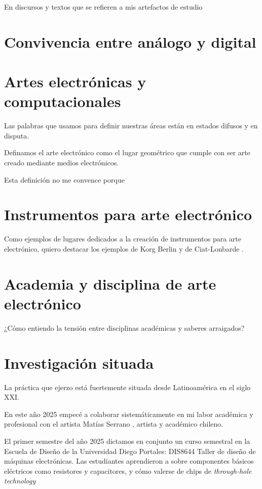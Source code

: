 \documentclass{article}
\begin{document}
En discursos y textos que se refieren a mis artefactos de estudio

\section{Convivencia entre análogo y digital}

\section{Artes electrónicas y computacionales}

Las palabras que usamos para definir nuestras áreas están en estados difusos y en disputa.

Definamos el arte electrónico como el lugar geométrico que cumple con ser arte creado mediante medios electrónicos.

Esta definición no me convence porque 


\section{Instrumentos para arte electrónico}

Como ejemplos de lugares dedicados a la creación de instrumentos para arte electrónico, quiero destacar los ejemplos de Korg Berlin \cite{korgBerlin} y de Ciat-Lonbarde \cite{ciatLonbarde}.

\section{Academia y disciplina de arte electrónico}

¿Cómo entiendo la tensión entre disciplinas académicas y saberes arraigados?

\section{Investigación situada}

La práctica que ejerzo está fuertemente situada desde Latinoamérica en el siglo XXI.

En este año 2025 empecé a colaborar sistemáticamente en mi labor académica y profesional con el artista Matías Serrano \cite{misaa}, artista y académico chileno.

El primer semestre del año 2025 dictamos en conjunto un curso semestral en la Escuela de Diseño de la Universidad Diego Portales: DIS8644 Taller de diseño de máquinas electrónicas. Las estudiantes aprendieron a sobre componentes básicos eléctricos como resistores y capacitores, y cómo valerse de chips de \textit{through-hole technology} \cite{tht}
\end{document}
